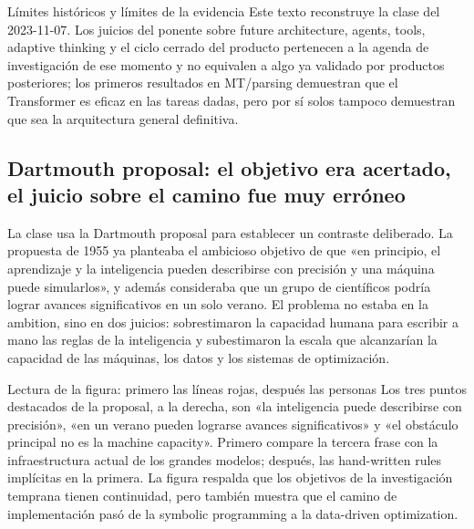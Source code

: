\begin{warningbox}{Límites históricos y límites de la evidencia}
Este texto reconstruye la clase del 2023-11-07. Los juicios del ponente sobre future architecture, agents, tools, adaptive thinking y el ciclo cerrado del producto pertenecen a la agenda de investigación de ese momento y no equivalen a algo ya validado por productos posteriores; los primeros resultados en MT/parsing demuestran que el Transformer es eficaz en las tareas dadas, pero por sí solos tampoco demuestran que sea la arquitectura general definitiva.
\end{warningbox}

\subsection{Dartmouth proposal: el objetivo era acertado, el juicio sobre el camino fue muy erróneo}

La clase usa la Dartmouth proposal para establecer un contraste deliberado. La propuesta de 1955 ya planteaba el ambicioso objetivo de que «en principio, el aprendizaje y la inteligencia pueden describirse con precisión y una máquina puede simularlos», y además consideraba que un grupo de científicos podría lograr avances significativos en un solo verano. El problema no estaba en la ambition, sino en dos juicios: sobrestimaron la capacidad humana para escribir a mano las reglas de la inteligencia y subestimaron la escala que alcanzarían la capacidad de las máquinas, los datos y los sistemas de optimización.


\begin{knowledgebox}{Lectura de la figura: primero las líneas rojas, después las personas}
Los tres puntos destacados de la proposal, a la derecha, son «la inteligencia puede describirse con precisión», «en un verano pueden lograrse avances significativos» y «el obstáculo principal no es la machine capacity». Primero compare la tercera frase con la infraestructura actual de los grandes modelos; después, las hand-written rules implícitas en la primera. La figura respalda que los objetivos de la investigación temprana tienen continuidad, pero también muestra que el camino de implementación pasó de la symbolic programming a la data-driven optimization.
\end{knowledgebox}

